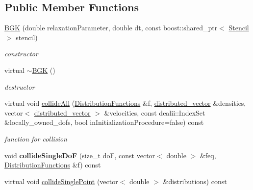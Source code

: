 \subsection*{Public Member Functions}
\begin{DoxyCompactItemize}
\item 
\hyperlink{classnatrium_1_1BGK_adf78ea65d5b96f55dc719b7ab7beb86d}{BGK} (double relaxationParameter, double dt, const boost::shared\_\-ptr$<$ \hyperlink{classnatrium_1_1Stencil}{Stencil} $>$ stencil)
\begin{DoxyCompactList}\small\item\em constructor \item\end{DoxyCompactList}\item 
\hypertarget{classnatrium_1_1BGK_a1029401a72788a6538e4e1941c305ab4}{
virtual \hyperlink{classnatrium_1_1BGK_a1029401a72788a6538e4e1941c305ab4}{$\sim$BGK} ()}
\label{classnatrium_1_1BGK_a1029401a72788a6538e4e1941c305ab4}

\begin{DoxyCompactList}\small\item\em destructor \item\end{DoxyCompactList}\item 
virtual void \hyperlink{classnatrium_1_1BGK_a9fa1c980217a183fc4762954e86ba36d}{collideAll} (\hyperlink{classnatrium_1_1DistributionFunctions}{DistributionFunctions} \&f, \hyperlink{namespacenatrium_a903d2b92917f582f2ff05f52160ab811}{distributed\_\-vector} \&densities, vector$<$ \hyperlink{namespacenatrium_a903d2b92917f582f2ff05f52160ab811}{distributed\_\-vector} $>$ \&velocities, const dealii::IndexSet \&locally\_\-owned\_\-dofs, bool inInitializationProcedure=false) const 
\begin{DoxyCompactList}\small\item\em function for collision \item\end{DoxyCompactList}\item 
\hypertarget{classnatrium_1_1BGK_ab82471c249d19fdc62005fb8b7e03190}{
void {\bfseries collideSingleDoF} (size\_\-t doF, const vector$<$ double $>$ \&feq, \hyperlink{classnatrium_1_1DistributionFunctions}{DistributionFunctions} \&f) const }
\label{classnatrium_1_1BGK_ab82471c249d19fdc62005fb8b7e03190}

\item 
\hypertarget{classnatrium_1_1BGK_aebf6d64d5e537c2e352451667d9003d4}{
virtual void \hyperlink{classnatrium_1_1BGK_aebf6d64d5e537c2e352451667d9003d4}{collideSinglePoint} (vector$<$ double $>$ \&distributions) const }
\label{classnatrium_1_1BGK_aebf6d64d5e537c2e352451667d9003d4}


\end{DoxyCompactItemize}
